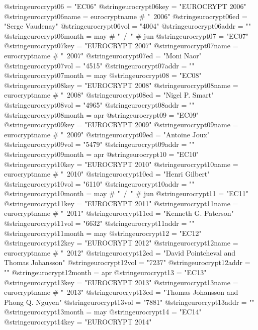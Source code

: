 @string{eurocrypt06 =           "EC06"}
@string{eurocrypt06key =        "EUROCRYPT 2006"}
@string{eurocrypt06name =       eurocryptname # "~2006"}
@string{eurocrypt06ed =         "Serge Vaudenay"}
@string{eurocrypt06vol =        "4004"}
@string{eurocrypt06addr =       ""}
@string{eurocrypt06month =      may # "~/~" # jun}
@string{eurocrypt07 =           "EC07"}
@string{eurocrypt07key =        "EUROCRYPT 2007"}
@string{eurocrypt07name =       eurocryptname # "~2007"}
@string{eurocrypt07ed =         "Moni Naor"}
@string{eurocrypt07vol =        "4515"}
@string{eurocrypt07addr =       ""}
@string{eurocrypt07month =      may}
@string{eurocrypt08 =           "EC08"}
@string{eurocrypt08key =        "EUROCRYPT 2008"}
@string{eurocrypt08name =       eurocryptname # "~2008"}
@string{eurocrypt08ed =         "Nigel P. Smart"}
@string{eurocrypt08vol =        "4965"}
@string{eurocrypt08addr =       ""}
@string{eurocrypt08month =      apr}
@string{eurocrypt09 =           "EC09"}
@string{eurocrypt09key =        "EUROCRYPT 2009"}
@string{eurocrypt09name =       eurocryptname # "~2009"}
@string{eurocrypt09ed =         "Antoine Joux"}
@string{eurocrypt09vol =        "5479"}
@string{eurocrypt09addr =       ""}
@string{eurocrypt09month =      apr}
@string{eurocrypt10 =           "EC10"}
@string{eurocrypt10key =        "EUROCRYPT 2010"}
@string{eurocrypt10name =       eurocryptname # "~2010"}
@string{eurocrypt10ed =         "Henri Gilbert"}
@string{eurocrypt10vol =        "6110"}
@string{eurocrypt10addr =       ""}
@string{eurocrypt10month =      may # "~/~" # jun}
@string{eurocrypt11 =           "EC11"}
@string{eurocrypt11key =        "EUROCRYPT 2011"}
@string{eurocrypt11name =       eurocryptname # "~2011"}
@string{eurocrypt11ed =         "Kenneth G. Paterson"}
@string{eurocrypt11vol =        "6632"}
@string{eurocrypt11addr =       ""}
@string{eurocrypt11month =      may}
@string{eurocrypt12 =           "EC12"}
@string{eurocrypt12key =        "EUROCRYPT 2012"}
@string{eurocrypt12name =       eurocryptname # "~2012"}
@string{eurocrypt12ed =         "David Pointcheval and Thomas Johansson"}
@string{eurocrypt12vol =        "7237"}
@string{eurocrypt12addr =       ""}
@string{eurocrypt12month =      apr}
@string{eurocrypt13 =           "EC13"}
@string{eurocrypt13key =        "EUROCRYPT 2013"}
@string{eurocrypt13name =       eurocryptname # "~2013"}
@string{eurocrypt13ed =         "Thomas Johansson and Phong Q. Nguyen"}
@string{eurocrypt13vol =        "7881"}
@string{eurocrypt13addr =       ""}
@string{eurocrypt13month =      may}
@string{eurocrypt14 =           "EC14"}
@string{eurocrypt14key =        "EUROCRYPT 2014"}
